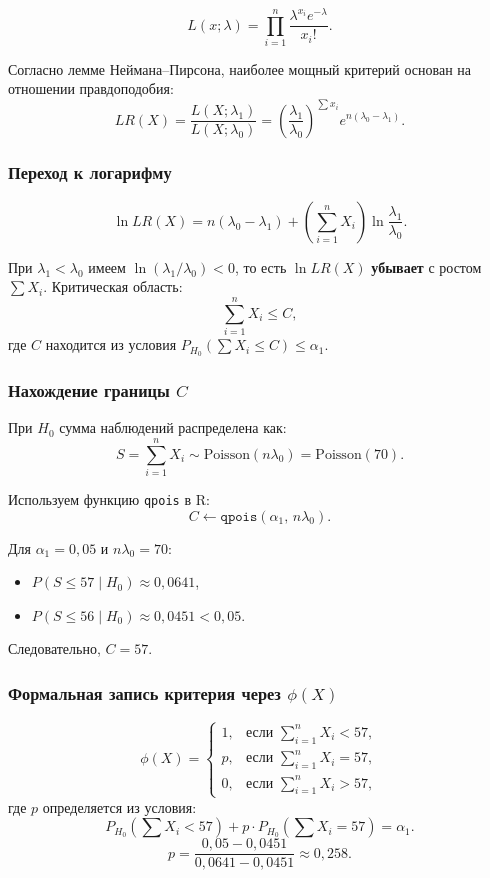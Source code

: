 \documentclass[12pt,a4paper]{article}
\begin{document}
	\[
	L(x;\lambda) = \prod_{i=1}^n \frac{\lambda^{x_i}e^{-\lambda}}{x_i!}.
	\]
	
	Согласно лемме Неймана--Пирсона, наиболее мощный критерий основан на
	отношении правдоподобия:
	\[
	LR(X) = \frac{L(X;\lambda_1)}{L(X;\lambda_0)}
	= \left(\frac{\lambda_1}{\lambda_0}\right)^{\sum x_i}
	e^{n(\lambda_0-\lambda_1)}.
	\]
	
	\subsubsection*{Переход к логарифму}
	
	\[
	\ln LR(X) = n(\lambda_0-\lambda_1) + \left(\sum_{i=1}^n X_i\right)\ln\frac{\lambda_1}{\lambda_0}.
	\]
	
	При $\lambda_1 < \lambda_0$ имеем $\ln(\lambda_1/\lambda_0) < 0$, то есть
	$\ln LR(X)$ \textbf{убывает} с ростом $\sum X_i$. Критическая область:
	\[
	\sum_{i=1}^n X_i \le C,
	\]
	где $C$ находится из условия $P_{H_0}\!\left(\sum X_i \le C\right) \le \alpha_1$.
	
	\subsubsection*{Нахождение границы $C$}
	
	При $H_0$ сумма наблюдений распределена как:
	\[
	S = \sum_{i=1}^n X_i \sim \mathrm{Poisson}(n\lambda_0) = \mathrm{Poisson}(70).
	\]
	
	Используем функцию \texttt{qpois} в R:
	\[
	C \leftarrow \texttt{qpois}(\alpha_1,\, n\lambda_0).
	\]
	
	Для $\alpha_1 = 0{,}05$ и $n\lambda_0 = 70$:
	\begin{itemize}
		\item $P(S \le 57 \mid H_0) \approx 0{,}0641$,
		\item $P(S \le 56 \mid H_0) \approx 0{,}0451 < 0{,}05$.
	\end{itemize}
	Следовательно, $C = 57$.
	
	\subsubsection*{Формальная запись критерия через $\phi(X)$}
	
	\[
	\phi(X) = \begin{cases}
		1, & \text{если } \sum_{i=1}^n X_i < 57,\\
		p, & \text{если } \sum_{i=1}^n X_i = 57,\\
		0, & \text{если } \sum_{i=1}^n X_i > 57,
	\end{cases}
	\]
	где $p$ определяется из условия:
	\[
	P_{H_0}\!\left(\sum X_i < 57\right) + p\cdot P_{H_0}\!\left(\sum X_i = 57\right) = \alpha_1.
	\]
	\[
	p = \frac{0{,}05 - 0{,}0451}{0{,}0641 - 0{,}0451} \approx 0{,}258.
	\]
	
\end{document}
